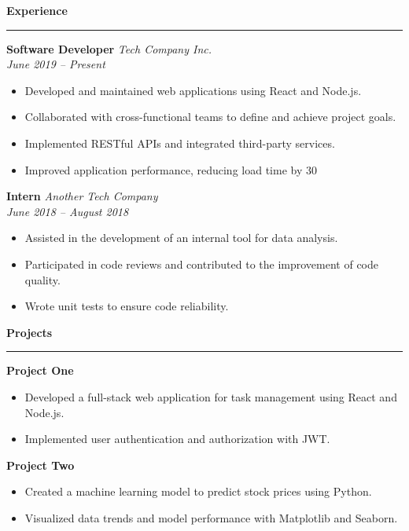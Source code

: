 \documentclass[a4paper,11pt]{article}
\newcommand{\sectiontitle}[1]{\textbf{\Large #1}\par\vspace{-1em}\noindent\rule{\linewidth}{0.3mm}\par\vspace{0.3em}}
\begin{document}
\begin{multicols}{2}
	\vspace{1em}

	\sectiontitle{Experience}

	\textbf{\large Software Developer} \hfill \textit{Tech Company Inc.}\\
	\textit{June 2019 -- Present}
	\begin{itemize}
		\item Developed and maintained web applications using React and Node.js.
		\item Collaborated with cross-functional teams to define and achieve project goals.
		\item Implemented RESTful APIs and integrated third-party services.
		\item Improved application performance, reducing load time by 30%
	\end{itemize}
	\vspace{0.5em}

	\textbf{\large Intern} \hfill \textit{Another Tech Company}\\
	\textit{June 2018 -- August 2018}
	\begin{itemize}
		\item Assisted in the development of an internal tool for data analysis.
		\item Participated in code reviews and contributed to the improvement of code quality.
		\item Wrote unit tests to ensure code reliability.
	\end{itemize}

	\vspace{1em}


	\sectiontitle{Projects}

	\textbf{\large Project One}
	\begin{itemize}
		\item Developed a full-stack web application for task management using React and Node.js.
		\item Implemented user authentication and authorization with JWT.
	\end{itemize}
	\vspace{0.5em}
    
	\textbf{\large Project Two}
	\begin{itemize}
		\item Created a machine learning model to predict stock prices using Python.
		\item Visualized data trends and model performance with Matplotlib and Seaborn.
	\end{itemize}


\end{multicols}
\end{document}
